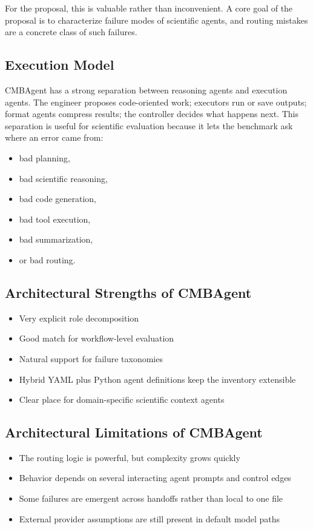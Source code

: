 \documentclass[11pt,a4paper]{article}
\begin{document}
For the proposal, this is valuable rather than inconvenient. A core goal of the
proposal is to characterize failure modes of scientific agents, and routing
mistakes are a concrete class of such failures.

\subsection{Execution Model}
CMBAgent has a strong separation between reasoning agents and execution agents.
The engineer proposes code-oriented work; executors run or save outputs; format
agents compress results; the controller decides what happens next. This
separation is useful for scientific evaluation because it lets the benchmark ask
where an error came from:
\begin{itemize}[leftmargin=1.5em]
\item bad planning,
\item bad scientific reasoning,
\item bad code generation,
\item bad tool execution,
\item bad summarization,
\item or bad routing.
\end{itemize}

\subsection{Architectural Strengths of CMBAgent}
\begin{itemize}[leftmargin=1.5em]
\item Very explicit role decomposition
\item Good match for workflow-level evaluation
\item Natural support for failure taxonomies
\item Hybrid YAML plus Python agent definitions keep the inventory extensible
\item Clear place for domain-specific scientific context agents
\end{itemize}

\subsection{Architectural Limitations of CMBAgent}
\begin{itemize}[leftmargin=1.5em]
\item The routing logic is powerful, but complexity grows quickly
\item Behavior depends on several interacting agent prompts and control edges
\item Some failures are emergent across handoffs rather than local to one file
\item External provider assumptions are still present in default model paths
\end{itemize}
\end{document}

